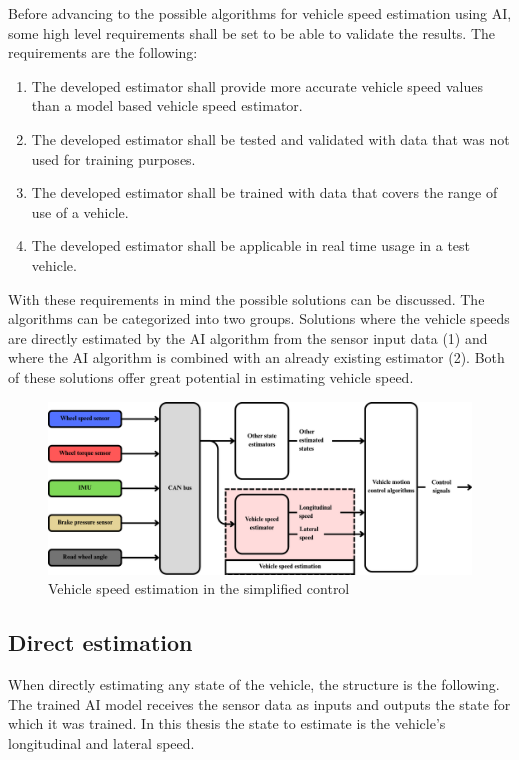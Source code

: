 Before advancing to the possible algorithms for vehicle speed estimation using AI, some high level requirements shall be set to be able to validate the results. The requirements are the following:
\begin{enumerate}
    \item The developed estimator shall provide more accurate vehicle speed values than a model based vehicle speed estimator.
    \item The developed estimator shall be tested and validated with data that was not used for training purposes. 
    \item The developed estimator shall be trained with data that covers the range of use of a vehicle. 
    \item The developed estimator shall be applicable in real time usage in a test vehicle. 
\end{enumerate}

With these requirements in mind the possible solutions can be discussed. The algorithms can be categorized into two groups. Solutions where the vehicle speeds are directly estimated by the AI algorithm from the sensor input data (1) and where the AI algorithm is combined with an already existing estimator (2). Both of these solutions offer great potential in estimating vehicle speed. 

\FloatBarrier
\begin{figure}[ht]
    \centering
    \includegraphics[width=1\textwidth]{images/Vehicle speed estimator.pdf}
    \caption{Vehicle speed estimation in the simplified control}
    \label{fig:vehicle speed estimation}
\end{figure}
\FloatBarrier

\subsection{Direct estimation}

When directly estimating any state of the vehicle, the structure is the following. The trained AI model receives the sensor data as inputs and outputs the state for which it was trained. In this thesis the state to estimate is the vehicle's longitudinal and lateral speed. 

